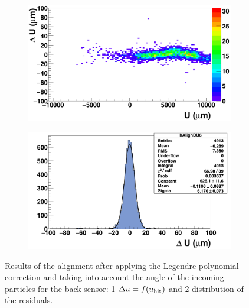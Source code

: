 \begin{figure}[!h]
        \begin{subfigure}[t]{0.45\textwidth}
          \centering
          \includegraphics[width = 1.2\textwidth]{Pictures/deformation/deltaUU_6_corrected1.png}
          \caption{}
          \label{fig:scatterDUU_corrected_back}
        \end{subfigure}
        \hfill
        \begin{subfigure}[t]{0.45\textwidth}
          \centering
          \includegraphics[width = 1.2\textwidth]{Pictures/deformation/deltaU_6_corrected1.png}
          \caption{}
          \label{fig:residualU_corrected_back}
        \end{subfigure}
        \caption{Results of the alignment after applying the Legendre polynomial correction and taking into account the angle of the incoming particles for the back sensor: \ref{fig:scatterDUU_corrected_back} $\Delta u=f(u_{\rm{hit}})$ and \ref{fig:residualU_corrected_back} distribution of the residuals.}
        \label{fig:alignmnetCorrected_back}

      \end{figure}


